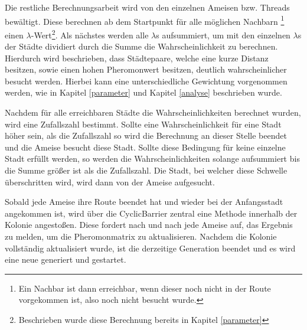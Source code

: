 Die restliche Berechnungsarbeit wird von den einzelnen Ameisen bzw. Threads bewältigt. Diese berechnen ab dem Startpunkt für alle möglichen Nachbarn
\footnote{Ein Nachbar ist dann erreichbar, wenn dieser noch nicht in der Route vorgekommen ist, also noch nicht besucht wurde.} einen $\lambda$-Wert\footnote{Beschrieben wurde diese Berechnung bereits in Kapitel \ref{parameter}}. 
Als nächstes werden alle $\lambda$s aufsummiert, um mit den einzelnen $\lambda$s der Städte dividiert durch die Summe die Wahrscheinlichkeit zu berechnen. Hierdurch wird beschrieben, dass Städtepaare, welche eine kurze Distanz besitzen, sowie einen hohen Pheromonwert besitzen, deutlich wahrscheinlicher besucht werden. Hierbei kann eine unterschiedliche Gewichtung vorgenommen werden, wie in Kapitel \ref{parameter} und Kapitel \ref{analyse} beschrieben wurde.

Nachdem für alle erreichbaren Städte die Wahrscheinlichkeiten berechnet wurden, wird eine Zufallszahl bestimmt. Sollte eine Wahrscheinlichkeit für eine Stadt höher sein, als die Zufallszahl so wird die Berechnung an dieser Stelle beendet und die Ameise besucht diese Stadt. Sollte diese Bedingung für keine einzelne Stadt erfüllt werden, so werden die Wahrscheinlichkeiten solange aufsummiert bis die Summe größer ist als die Zufallszahl. Die Stadt, bei welcher diese Schwelle überschritten wird, wird dann von der Ameise aufgesucht.

Sobald jede Ameise ihre Route beendet hat und wieder bei der Anfangsstadt angekommen ist, wird über die CyclicBarrier zentral eine Methode innerhalb der Kolonie angestoßen. Diese fordert nach und nach jede Ameise auf, das Ergebnis zu melden, um die Pheromonmatrix zu aktualisieren. Nachdem die Kolonie vollständig aktualisiert wurde, ist die derzeitige Generation beendet und es wird eine neue generiert und gestartet.